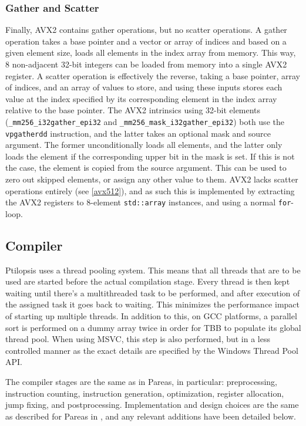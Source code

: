 \documentclass[12pt,dvipsnames]{article}
\newcommand{\icpp}[1]{\texttt{#1}}
\newcommand{\mono}[1]{\texttt{#1}}
\begin{document}
\subsubsection*{Gather and Scatter}
Finally, AVX2 contains gather operations, but no scatter operations. A gather operation takes a base pointer and a vector or array of indices and based on a given element size, loads all elements in the index array from memory. This way, 8 non-adjacent 32-bit integers can be loaded from memory into a single AVX2 register. A scatter operation is effectively the reverse, taking a base pointer, array of indices, and an array of values to store, and using these inputs stores each value at the index specified by its corresponding element in the index array relative to the base pointer. The AVX2 intrinsics using 32-bit elements (\icpp{_mm256_i32gather_epi32} and \icpp{_mm256_mask_i32gather_epi32}) both use the \mono{vpgatherdd} instruction, and the latter takes an optional mask and source argument. The former unconditionally loads all elements, and the latter only loads the element if the corresponding upper bit in the mask is set. If this is not the case, the element is copied from the source argument. This can be used to zero out skipped elements, or assign any other value to them. AVX2 lacks scatter operations entirely (see \autoref{avx512}), and as such this is implemented by extracting the AVX2 registers to 8-element \icpp{std::array} instances, and using a normal \icpp{for}-loop.

\subsection{Compiler}
Ptilopsis uses a thread pooling system. This means that all threads that are to be used are started before the actual compilation stage. Every thread is then kept waiting until there's a multithreaded task to be performed, and after execution of the assigned task it goes back to waiting. This minimizes the performance impact of starting up multiple threads. In addition to this, on GCC platforms, a parallel sort is performed on a dummy array twice in order for TBB to populate its global thread pool. When using MSVC, this step is also performed, but in a less controlled manner as the exact details are specified by the Windows Thread Pool API.

The compiler stages are the same as in Pareas, in particular: preprocessing, instruction counting, instruction generation, optimization, register allocation, jump fixing, and postprocessing. Implementation and design choices are the same as described for Pareas in \cite{huijben2021}, and any relevant additions have been detailed below. 
\end{document}
